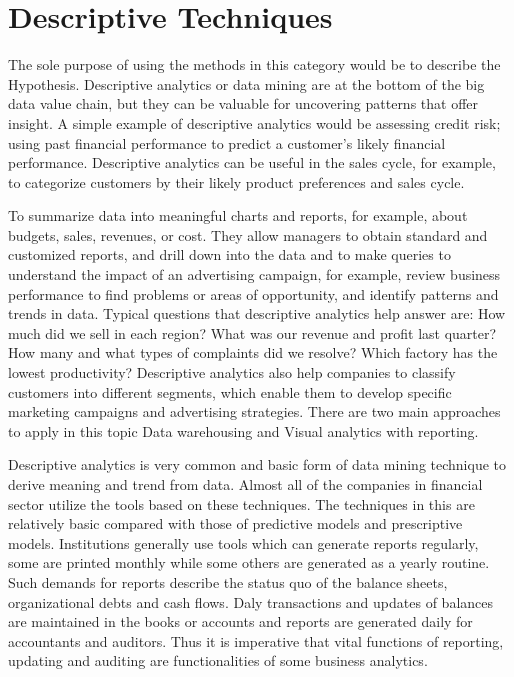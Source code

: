 \chapter{Descriptive Techniques} 
\label{descriptive-techniques}

The sole purpose of using the methods in this category would be to describe the Hypothesis. Descriptive analytics or data mining are at the bottom of the big data value chain, but they can be valuable for uncovering patterns that offer insight. A simple example of descriptive analytics would be assessing credit risk; using past financial performance to predict a customer’s likely financial performance. Descriptive analytics can be useful in the sales cycle, for example, to categorize customers by their likely product preferences and sales cycle.

To summarize data into meaningful charts and reports, for example, about budgets, sales, revenues, or cost. They allow managers to obtain standard and customized reports, and drill down into the data and to make queries to understand the impact of an advertising campaign, for example, review business performance to find problems or areas of opportunity, and identify patterns and trends in data. Typical questions that descriptive analytics help answer are: How much did we sell in each region? What was our revenue and profit last quarter? How many and what types of complaints did we resolve? Which factory has the lowest productivity? Descriptive analytics also help companies to classify customers into different segments, which enable them to develop specific marketing campaigns and advertising strategies.
There are two main approaches to apply in this topic Data warehousing and Visual analytics with reporting.

Descriptive analytics is very common and basic form of data mining technique to derive meaning and trend from data. Almost all of the companies in financial sector utilize the tools based on these techniques. The techniques in this are relatively basic compared with those of predictive models and prescriptive models. Institutions generally use tools which can generate reports regularly, some are printed monthly while some others are generated  as a yearly routine. Such demands for reports describe the status quo of the balance sheets, organizational debts and cash flows. Daly transactions and updates of balances are maintained in the books or accounts and reports are generated daily for accountants and auditors. Thus it is imperative that vital functions of reporting, updating and auditing are functionalities of some business analytics.

